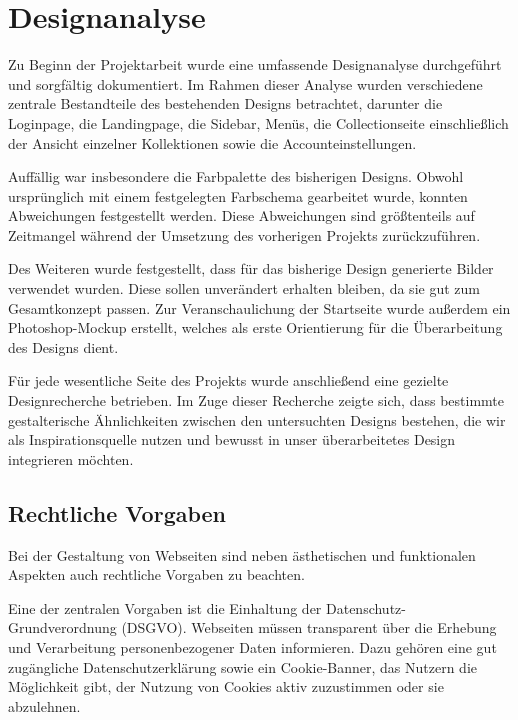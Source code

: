 \section{Designanalyse}\label{sec:section-three}

Zu Beginn der Projektarbeit wurde eine umfassende Designanalyse durchgeführt und sorgfältig dokumentiert.
Im Rahmen dieser Analyse wurden verschiedene zentrale Bestandteile des bestehenden Designs betrachtet, darunter die Loginpage, die Landingpage, die Sidebar, Menüs, die Collectionseite einschließlich der Ansicht einzelner Kollektionen sowie die Accounteinstellungen. \break


Auffällig war insbesondere die Farbpalette des bisherigen Designs.
Obwohl ursprünglich mit einem festgelegten Farbschema gearbeitet wurde, konnten Abweichungen festgestellt werden.
Diese Abweichungen sind größtenteils auf Zeitmangel während der Umsetzung des vorherigen Projekts zurückzuführen. \break

Des Weiteren wurde festgestellt, dass für das bisherige Design generierte Bilder verwendet wurden.
Diese sollen unverändert erhalten bleiben, da sie gut zum Gesamtkonzept passen.
Zur Veranschaulichung der Startseite wurde außerdem ein Photoshop-Mockup erstellt, welches als erste Orientierung für die Überarbeitung des Designs dient. \break

Für jede wesentliche Seite des Projekts wurde anschließend eine gezielte Designrecherche betrieben.
Im Zuge dieser Recherche zeigte sich, dass bestimmte gestalterische Ähnlichkeiten zwischen den untersuchten Designs bestehen, die wir als Inspirationsquelle nutzen und bewusst in unser überarbeitetes Design integrieren möchten. \break


\subsection{Rechtliche Vorgaben}\label{subsec:subsection-three-one}

Bei der Gestaltung von Webseiten sind neben ästhetischen und funktionalen Aspekten auch rechtliche Vorgaben zu beachten. \break

Eine der zentralen Vorgaben ist die Einhaltung der Datenschutz-Grundverordnung (DSGVO).
Webseiten müssen transparent über die Erhebung und Verarbeitung personenbezogener Daten informieren.
Dazu gehören eine gut zugängliche Datenschutzerklärung sowie ein Cookie-Banner, das Nutzern die Möglichkeit gibt, der Nutzung von Cookies aktiv zuzustimmen oder sie abzulehnen. \break

